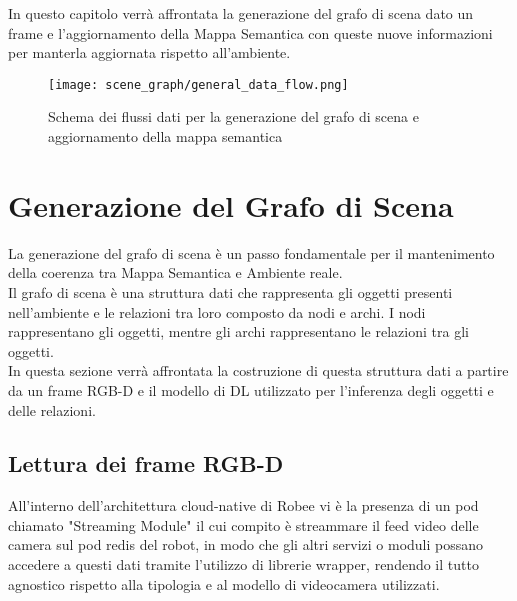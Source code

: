 In questo capitolo verrà affrontata la generazione del grafo di scena dato un frame e l'aggiornamento della Mappa Semantica con queste nuove informazioni per manterla aggiornata rispetto all'ambiente.
\begin{figure}[h]
	\texttt{[image: scene\_graph/general\_data\_flow.png]}
	\caption{Schema dei flussi dati per la generazione del grafo di scena e aggiornamento della mappa semantica }
\end{figure}

\section{Generazione del Grafo di Scena}
La generazione del grafo di scena è un passo fondamentale per il mantenimento della coerenza tra Mappa Semantica e Ambiente reale.\\
Il grafo di scena è una struttura dati che rappresenta gli oggetti presenti nell'ambiente e le relazioni tra loro composto da nodi e archi. I nodi rappresentano gli oggetti, mentre gli archi rappresentano le relazioni tra gli oggetti. \\
In questa sezione verrà affrontata la costruzione di questa struttura dati a partire da un frame RGB-D e il modello di DL utilizzato per l'inferenza degli oggetti e delle relazioni.
\subsection{Lettura dei frame RGB-D}
All'interno dell'architettura cloud-native di Robee vi è la presenza di un pod chiamato "Streaming Module" il cui compito è streammare il feed video delle camera sul pod redis del robot, in modo che gli altri servizi o moduli possano accedere a questi dati tramite l'utilizzo di librerie wrapper, rendendo il tutto agnostico rispetto alla tipologia e al modello di videocamera utilizzati.

